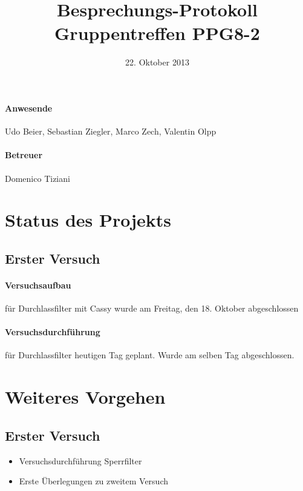 \documentclass[
]{scrartcl}
\begin{document}
\title{Besprechungs-Protokoll Gruppentreffen PPG8-2}
\date{22. Oktober 2013}
\maketitle

\paragraph*{Anwesende}
Udo Beier,
Sebastian Ziegler,
Marco Zech,
Valentin Olpp
\paragraph*{Betreuer}
Domenico Tiziani

\section{Status des Projekts}
\subsection{Erster Versuch}
\paragraph{Versuchsaufbau} für Durchlassfilter mit Cassy wurde am Freitag, den 18. Oktober abgeschlossen
\paragraph{Versuchsdurchführung} für Durchlassfilter heutigen Tag geplant. Wurde am selben Tag abgeschlossen.
\section{Weiteres Vorgehen}
\subsection{Erster Versuch}
\begin{itemize}
\item Versuchsdurchführung Sperrfilter
\item Erste Überlegungen zu zweitem Versuch
\end{itemize}
\end{document}
